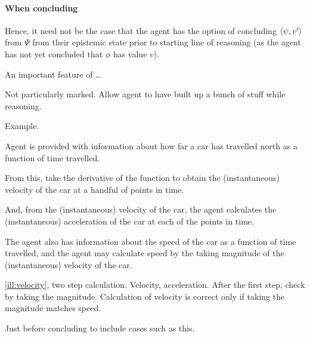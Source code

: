 \paragraph{When concluding}

\begin{note}
  Hence, it need not be the case that the agent has the option of concluding \(\langle \psi, v' \rangle\) from \(\Psi\) from their epistemic state prior to starting line of reasoning (as the agent has not yet concluded that \(\phi\) has value \(v\)).
\end{note}

\begin{note}
  An important feature of \qzS{} \dots

  Not particularly marked.
  Allow agent to have built up a bunch of stuff while reasoning.

  Example.

  \begin{scenario}[Velocity]
    \label{ill:velocity}
    Agent is provided with information about how far a car has travelled north as a function of time travelled.

    From this, take the derivative of the function to obtain the (instantaneous) velocity of the car at a handful of points in time.

    And, from the (instantaneous) velocity of the car, the agent calculates the (instantaneous) acceleration of the car at each of the points in time.

    The agent also has information about the speed of the car as a function of time travelled, and the agent may calculate speed by the taking magnitude of the (instantaneous) velocity of the car.
  \end{scenario}

  \autoref{ill:velocity}, two step calculation.
  Velocity, acceleration.
  After the first step, check by taking the magnitude.
  Calculation of velocity is correct only if taking the magnitude matches speed.

  Just before concluding to include cases such as this.
\end{note}

